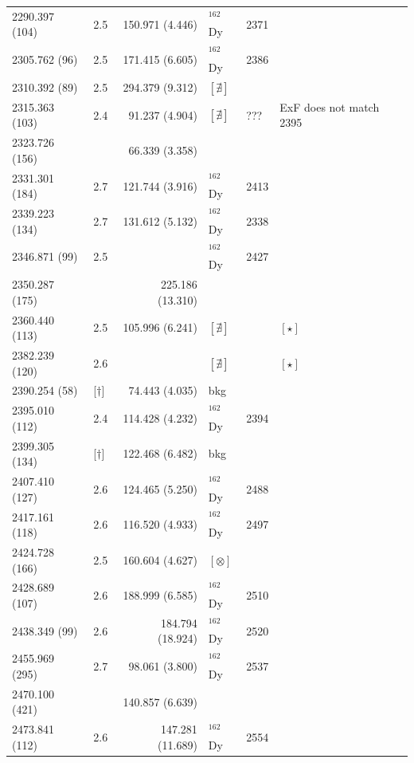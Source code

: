 \begin{landscape}
\begin{center}
\begin{longtable}{p{2.6cm}|p{1.2cm}|r|p{1.1cm}|p{2.0cm}|l}
  2290.397 (104) & 2.5        &150.971 (4.446)& $^{162}$Dy & 2371 & \\   
  2305.762 (96)  & 2.5        &171.415 (6.605)& $^{162}$Dy & 2386 & \\   
  2310.392 (89)  & 2.5        &294.379 (9.312)& $[\nexists]$ & & \\   
  2315.363 (103) & 2.4        & 91.237 (4.904)& $[\nexists]$ & ??? &ExF does not match 2395 \\   
  2323.726 (156) &            & 66.339 (3.358)& & & \\   
  2331.301 (184) & 2.7        &121.744 (3.916)& $^{162}$Dy & 2413 & \\   
  2339.223 (134) & 2.7        &131.612 (5.132)& $^{162}$Dy & 2338 & \\   
  2346.871 (99)  & 2.5        && $^{162}$Dy & 2427 & \\   
  2350.287 (175) &            &225.186 (13.310)& & & \\   
  2360.440 (113) & 2.5        &105.996 (6.241)& $[\nexists]$ & &$[\star]$ \\   
  2382.239 (120) & 2.6        && $[\nexists]$ & &$[\star]$ \\   
  2390.254 (58)  & [$\dagger$]  & 74.443 (4.035)& bkg & &  \\   
  2395.010 (112) & 2.4        &114.428 (4.232)& $^{162}$Dy & 2394 & \\   
  2399.305 (134) & [$\dagger$]  &122.468 (6.482)& bkg & & \\   
  2407.410 (127) & 2.6        &124.465 (5.250)& $^{162}$Dy & 2488 & \\   
  2417.161 (118) & 2.6        &116.520 (4.933)& $^{162}$Dy &  2497 &\\   
  2424.728 (166) & 2.5        &160.604 (4.627)& $[\otimes]$ & & \\   
  2428.689 (107) & 2.6        &188.999  (6.585)& $^{162}$Dy & 2510 & \\   
  2438.349 (99)  & 2.6        &184.794 (18.924)& $^{162}$Dy & 2520 & \\   
  2455.969 (295) & 2.7        & 98.061  (3.800)& $^{162}$Dy & 2537 &  \\   
  2470.100 (421) &            &140.857  (6.639)& & & \\   
  2473.841 (112) & 2.6        &147.281 (11.689)& $^{162}$Dy & 2554 & \\   

\end{longtable}
\end{center}
\end{landscape}
